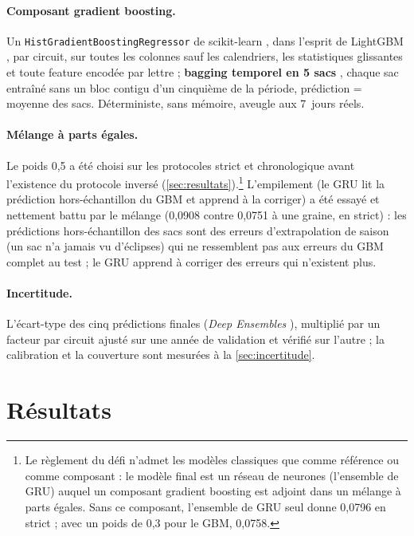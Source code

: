 \documentclass[11pt,a4paper]{article}
\begin{document}
\paragraph{Composant gradient boosting.} Un \texttt{HistGradientBoostingRegressor} de scikit-learn \citep{pedregosa2011scikit}, dans l'esprit de LightGBM \citep{ke2017lightgbm}, par circuit, sur toutes les colonnes sauf les calendriers, les statistiques glissantes et toute feature encodée par lettre ; \textbf{bagging temporel en 5 sacs} \citep{breiman1996bagging}, chaque sac entraîné sans un bloc contigu d'un cinquième de la période, prédiction = moyenne des sacs. Déterministe, sans mémoire, aveugle aux 7~jours réels.

\paragraph{Mélange à parts égales.} Le poids 0,5 a été choisi sur les protocoles strict et chronologique avant l'existence du protocole inversé (\autoref{sec:resultats}).\footnote{Le règlement du défi n'admet les modèles classiques que comme référence ou comme composant : le modèle final est un réseau de neurones (l'ensemble de GRU) auquel un composant gradient boosting est adjoint dans un mélange à parts égales. Sans ce composant, l'ensemble de GRU seul donne 0,0796 en strict ; avec un poids de 0,3 pour le GBM, 0,0758.} L'empilement (le GRU lit la prédiction hors-échantillon du GBM et apprend à la corriger) a été essayé et nettement battu par le mélange (0,0908 contre 0,0751 à une graine, en strict) : les prédictions hors-échantillon des sacs sont des erreurs d'extrapolation de saison (un sac n'a jamais vu d'éclipses) qui ne ressemblent pas aux erreurs du GBM complet au test ; le GRU apprend à corriger des erreurs qui n'existent plus.

\paragraph{Incertitude.} L'écart-type des cinq prédictions finales (\emph{Deep Ensembles} \citep{lakshminarayanan2017deep}), multiplié par un facteur par circuit ajusté sur une année de validation et vérifié sur l'autre ; la calibration et la couverture sont mesurées à la \autoref{sec:incertitude}.

\section{Résultats}\label{sec:resultats}
\end{document}
